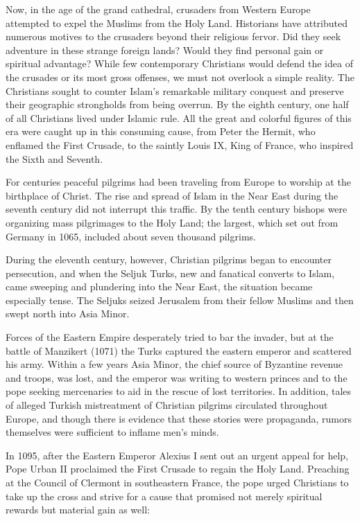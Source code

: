 Now, in the age of the grand cathedral, crusaders from Western Europe attempted to expel the Muslims
from the Holy Land. Historians have attributed numerous motives to the crusaders beyond their
religious fervor. Did they seek adventure in these strange foreign lands? Would they find personal
gain or spiritual advantage? While few contemporary Christians would defend the idea of the crusades
or its most gross offenses, we must not overlook a simple reality. The Christians sought to counter
Islam’s remarkable military conquest and preserve their geographic strongholds from being overrun.
By the eighth century, one half of all Christians lived under Islamic rule. All the great and
colorful figures of this era were caught up in this consuming cause, from Peter the Hermit, who
enflamed the First Crusade, to the saintly Louis IX, King of France, who inspired the Sixth and
Seventh.

For centuries peaceful pilgrims had been traveling from Europe to worship at the birthplace of
Christ. The rise and spread of Islam in the Near East during the seventh century did not interrupt
this traffic. By the tenth century bishops were organizing mass pilgrimages to the Holy Land; the
largest, which set out from Germany in 1065, included about seven thousand pilgrims.

During the eleventh century, however, Christian pilgrims began to encounter persecution, and when
the Seljuk Turks, new and fanatical converts to Islam, came sweeping and plundering into the Near
East, the situation became especially tense. The Seljuks seized Jerusalem from their fellow Muslims
and then swept north into Asia Minor.

Forces of the Eastern Empire desperately tried to bar the invader, but at the battle of Manzikert
(1071) the Turks captured the eastern emperor and scattered his army. Within a few years Asia Minor,
the chief source of Byzantine revenue and troops, was lost, and the emperor was writing to western
princes and to the pope seeking mercenaries to aid in the rescue of lost territories. In addition,
tales of alleged Turkish mistreatment of Christian pilgrims circulated throughout Europe, and though
there is evidence that these stories were propaganda, rumors themselves were sufficient to inflame
men’s minds.

In 1095, after the Eastern Emperor Alexius I sent out an urgent appeal for help, Pope Urban II
proclaimed the First Crusade to regain the Holy Land. Preaching at the Council of Clermont in
southeastern France, the pope urged Christians to take up the cross and strive for a cause that
promised not merely spiritual rewards but material gain as well:

